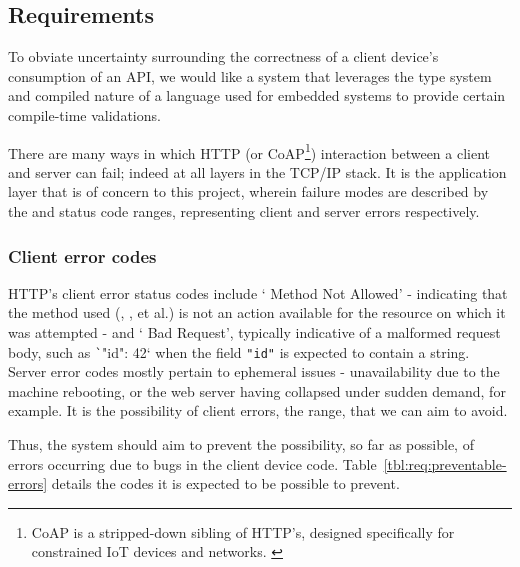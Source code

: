\subsection{Requirements}\label{intro:req}

To obviate uncertainty surrounding the correctness of a client device's consumption of an API, we would like a system that leverages the type system and compiled nature of a language used for embedded systems to provide certain compile-time validations.

There are many ways in which HTTP (or CoAP\footnote{CoAP is a stripped-down sibling of HTTP's, designed specifically for constrained IoT devices and networks. \cite{rfc7252}}) interaction between a client and server can fail; indeed at all layers in the TCP/IP stack. It is the application layer that is of concern to this project, wherein failure modes are described by the  and  status code ranges, representing client and server errors respectively.

\subsubsection{Client error codes}\label{intro:req:client-errors}
HTTP's client error status codes include ` Method Not Allowed' - indicating that the method used (, , et al.) is not an action available for the resource on which it was attempted - and ` Bad Request', typically indicative of a malformed request body, such as \texttt`{"id": 42}` when the field \texttt{"id"} is expected to contain a string. Server error codes mostly pertain to ephemeral issues - unavailability due to the machine rebooting, or the web server having collapsed under sudden demand, for example. It is the possibility of client errors, the  range, that we can aim to avoid.

Thus, the system should aim to prevent the possibility, so far as possible, of errors occurring due to bugs in the client device code. Table~\ref{tbl:req:preventable-errors} details the codes it is expected to be possible to prevent.

